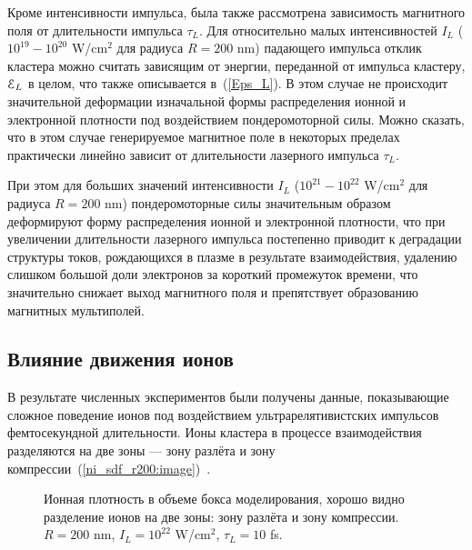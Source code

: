 
Кроме интенсивности импульса, была также рассмотрена зависимость магнитного поля от длительности импульса $\tau_L$. Для относительно малых интенсивностей $I_L$ ($10^{19} - 10^{20}$ W/cm$^{2}$ для радиуса $R = 200$ nm) падающего импульса отклик кластера можно считать зависящим от энергии, переданной от импульса кластеру, $\EuScript{E}_L$ в целом, что также описывается в~(\ref{Eps_L}). В этом случае не происходит значительной деформации изначальной формы распределения ионной и электронной плотности под воздействием пондеромоторной силы. Можно сказать, что в этом случае генерируемое магнитное поле в некоторых пределах практически линейно зависит от длительности лазерного импульса $\tau_L$. 

При этом для больших значений интенсивности $I_L$ ($10^{21} - 10^{22}$ W/cm$^{2}$ для радиуса $R = 200$ nm) пондеромоторные силы значительным образом деформируют форму распределения ионной и электронной плотности, что при увеличении длительности лазерного импульса постепенно приводит к деградации структуры токов, рождающихся в плазме в результате взаимодействия, удалению слишком большой доли электронов за короткий промежуток времени, что значительно снижает выход магнитного поля и препятствует образованию магнитных мультиполей.

\subsection{Влияние движения ионов}

В результате численных экспериментов были получены данные, показывающие сложное поведение ионов под воздействием ультрарелятивистских импульсов фемтосекундной длительности. Ионы кластера в процессе взаимодействия разделяются на две зоны --- зону разлёта и зону компрессии~(\autoref{ni_sdf_r200:image})~\cite{ncfm2023}.


\begin{figure}[H]
    \hfil
    \caption{Ионная плотность в объеме бокса моделирования, хорошо видно разделение ионов на две зоны: зону разлёта и зону компрессии. $R = 200$ nm, $I_L = 10^{22}$ W/cm$^{2}$, $\tau_L = 10$ fs.}\label{ni_sdf_r200:image}
\end{figure}


